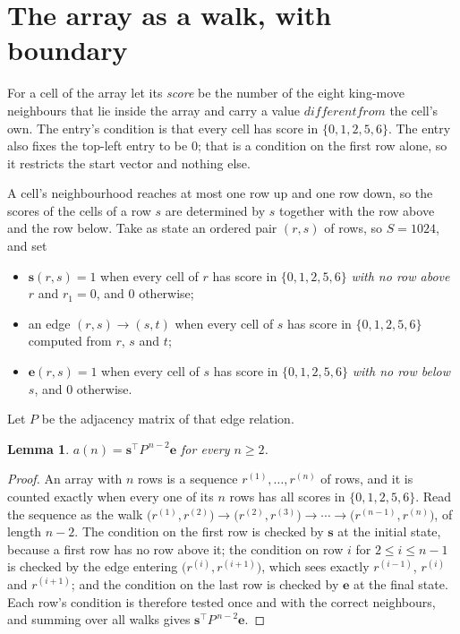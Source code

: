 \documentclass[11pt,a4paper]{article}
\theoremstyle{plain}
\newtheorem{lemma}[theorem]{Lemma}
\theoremstyle{definition}
\begin{document}
\section{The array as a walk, with boundary}

For a cell of the array let its \emph{score} be the number of the eight king-move neighbours that lie inside
the array and carry a value $different from$ the cell's own. The entry's condition is that every cell
has score in $\{0,1,2,5,6\}$. The entry also fixes the top-left entry to be $0$; that is a condition on the first row alone, so it restricts the start vector and nothing else.

A cell's neighbourhood reaches at most one row up and one row down, so the scores of the
cells of a row $s$ are determined by $s$ together with the row above and the row below.
Take as state an ordered pair $(r,s)$ of rows, so $S=1024$, and set
\begin{itemize}
\item $\mathbf{s}(r,s)=1$ when every cell of $r$ has score in $\{0,1,2,5,6\}$ \emph{with no row
above $r$} and $r_1=0$, and $0$ otherwise;
\item an edge $(r,s)\to(s,t)$ when every cell of $s$ has score in $\{0,1,2,5,6\}$ computed from
$r$, $s$ and $t$;
\item $\mathbf{e}(r,s)=1$ when every cell of $s$ has score in $\{0,1,2,5,6\}$ \emph{with no row
below $s$}, and $0$ otherwise.
\end{itemize}
Let $P$ be the adjacency matrix of that edge relation.

\begin{lemma}\label{lem:walk}
$a(n)=\mathbf{s}^{\!\top}P^{\,n-2}\mathbf{e}$ for every $n\ge2$.
\end{lemma}

\begin{proof}
An array with $n$ rows is a sequence $r^{(1)},\dots,r^{(n)}$ of rows, and it is counted
exactly when every one of its $n$ rows has all scores in $\{0,1,2,5,6\}$. Read the sequence as the
walk $\bigl(r^{(1)},r^{(2)}\bigr)\to\bigl(r^{(2)},r^{(3)}\bigr)\to\cdots\to
\bigl(r^{(n-1)},r^{(n)}\bigr)$, of length $n-2$. The condition on the first row is
checked by $\mathbf{s}$ at the initial state, because a first row has no row above it; the
condition on row $i$ for $2\le i\le n-1$ is checked by the edge entering
$\bigl(r^{(i)},r^{(i+1)}\bigr)$, which sees exactly $r^{(i-1)}$, $r^{(i)}$ and
$r^{(i+1)}$; and the condition on the last row is checked by $\mathbf{e}$ at the final
state. Each row's condition is therefore tested once and with the correct neighbours, and
summing over all walks gives $\mathbf{s}^{\!\top}P^{\,n-2}\mathbf{e}$.
\end{proof}
\end{document}
